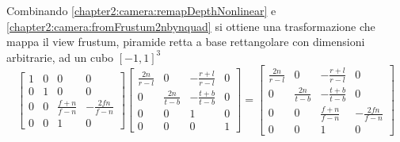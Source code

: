 Combinando \ref{chapter2:camera:remapDepthNonlinear} e \ref{chapter2:camera:fromFrustum2nbynquad} si ottiene una trasformazione che mappa il view
frustum, piramide retta a base rettangolare con dimensioni arbitrarie, ad un cubo $[-1,1]^3$
\begin{equation}\label{chapter2:camera:perspectiveMatrix}
	\begin{bmatrix}
		1 & 0 & 0 & 0 \\ 0 & 1 & 0 & 0 \\ 0 & 0 & \frac{f+n}{f-n} & -\frac{2fn}{f-n} \\ 0 & 0 & 1 & 0
	\end{bmatrix}
	\begin{bmatrix}
		\frac{2n}{r-l} & 0 & -\frac{r+l}{r-l} & 0 \\ 0 & \frac{2n}{t-b} & -\frac{t+b}{t-b} & 0 \\ 0 & 0 & 1 & 0 \\ 0 & 0 & 0 & 1
	\end{bmatrix}
	=
	\begin{bmatrix}
		\frac{2n}{r-l} & 0 & -\frac{r+l}{r-l} & 0 \\ 0 & \frac{2n}{t-b} & -\frac{t+b}{t-b} & 0 \\ 0 & 0 & \frac{f+n}{f-n} & -\frac{2fn}{f-n} 
		\\ 0 & 0 & 1 & 0
	\end{bmatrix}
\end{equation}

